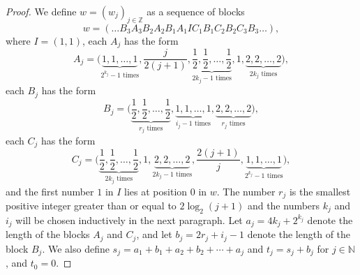 \documentclass[12pt]{amsart}
\theoremstyle{theorem}
\theoremstyle{definition}
\theoremstyle{remark} \theoremstyle{question} \theoremstyle{example}
\newcommand{\N}{\mathbb{N}}   %
\newcommand{\Z}{\mathbb{Z}}   %
\begin{document}
\begin{proof}
We define $w = (w_j)_{j \in \Z}$ as a sequence of blocks
\[
w = (\ldots B_3 A_3 B_2 A_2 B_1 A_1 I C_1 B_1 C_2 B_2 C_3 B_3 \ldots),
\]
where $I = (1,1)$, each $A_j$ has the form
\[
A_j = \Big(\underbrace{1,1,\ldots,1}_{2^{k_j} - 1 \text{ times}},\frac{j}{2(j+1)},
\underbrace{\frac{1}{2},\frac{1}{2},\ldots,\frac{1}{2}}_{2k_j - 1 \text{ times}},1,\underbrace{2,2,\ldots,2}_{2k_j \text{ times}}\Big),
\]
each $B_j$ has the form
\[
B_j = \Big(\underbrace{\frac{1}{2},\frac{1}{2},\ldots,\frac{1}{2}}_{r_j \text{ times}},
\underbrace{1,1,\ldots,1}_{i_j - 1 \text{ times}},\underbrace{2,2,\ldots,2}_{r_j \text{ times}}\Big),
\]
each $C_j$ has the form
\[
C_j = \Big(\underbrace{\frac{1}{2},\frac{1}{2},\ldots,\frac{1}{2}}_{2k_j \text{ times}},1,
\underbrace{2,2,\ldots,2}_{2k_j - 1 \text{ times}},\frac{2(j+1)}{j},\underbrace{1,1,\ldots,1}_{2^{k_j} - 1 \text{ times}}\Big),
\]
and the first number $1$ in $I$ lies at position $0$ in $w$.
The number $r_j$ is the smallest positive integer greater than or equal to $2\log_2(j+1)$ 
and the numbers $k_j$ and $i_j$ will be chosen inductively in the next paragraph.
Let $a_j = 4k_j + 2^{k_j}$ denote the length of the blocks $A_j$ and $C_j$, and let $b_j = 2r_j + i_j - 1$ denote the length of the block $B_j$.
We also define $s_j = a_1+b_1+a_2+b_2+\cdots+a_j$ and $t_j = s_j + b_j$ for $j \in \N$, and $t_0 = 0$.


\end{proof}
\end{document}
